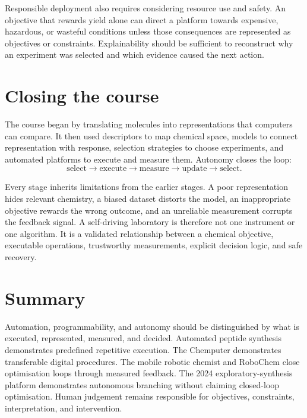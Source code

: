 Responsible deployment also requires considering resource use and safety.
An objective that rewards yield alone can direct a platform towards expensive, hazardous, or wasteful conditions unless those consequences are represented as objectives or constraints.
Explainability should be sufficient to reconstruct why an experiment was selected and which evidence caused the next action.

\section{Closing the course}

The course began by translating molecules into representations that computers can compare.
It then used descriptors to map chemical space, models to connect representation with response, selection strategies to choose experiments, and automated platforms to execute and measure them.
Autonomy closes the loop:
\begin{equation}
  \text{select}\longrightarrow\text{execute}\longrightarrow\text{measure}\longrightarrow\text{update}\longrightarrow\text{select}.
\end{equation}

Every stage inherits limitations from the earlier stages.
A poor representation hides relevant chemistry, a biased dataset distorts the model, an inappropriate objective rewards the wrong outcome, and an unreliable measurement corrupts the feedback signal.
A self-driving laboratory is therefore not one instrument or one algorithm.
It is a validated relationship between a chemical objective, executable operations, trustworthy measurements, explicit decision logic, and safe recovery.

\section{Summary}

Automation, programmability, and autonomy should be distinguished by what is executed, represented, measured, and decided.
Automated peptide synthesis demonstrates predefined repetitive execution.
The Chemputer demonstrates transferable digital procedures.
The mobile robotic chemist and RoboChem close optimisation loops through measured feedback.
The 2024 exploratory-synthesis platform demonstrates autonomous branching without claiming closed-loop optimisation.
Human judgement remains responsible for objectives, constraints, interpretation, and intervention.
